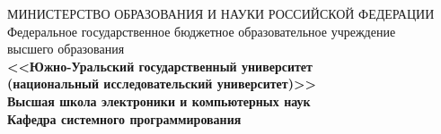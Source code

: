 \newpage
\thispagestyle{empty}
\begin{adjustwidth}[]{0cm}{0cm}
\begin{center}
\begin{linespread}{1}


\small{
МИНИСТЕРСТВО ОБРАЗОВАНИЯ И НАУКИ РОССИЙСКОЙ ФЕДЕРАЦИИ\\
Федеральное государственное бюджетное образовательное учреждение\\
высшего образования\\
\textbf{<<Южно-Уральский государственный университет\\
(национальный исследовательский университет)>>\\
Высшая школа электроники и компьютерных наук\\
Кафедра системного программирования}
}







\end{linespread}
\end{center}
\end{adjustwidth}
